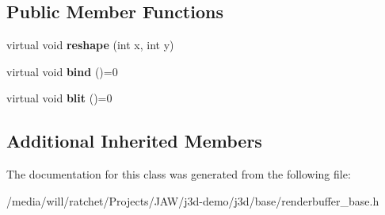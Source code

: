 \subsection*{Public Member Functions}
\begin{DoxyCompactItemize}
\item 
\hypertarget{classj3d_1_1base_1_1RenderbufferBase_a4d46858cdbeb14059b966103f49b1e6d}{}virtual void {\bfseries reshape} (int x, int y)\label{classj3d_1_1base_1_1RenderbufferBase_a4d46858cdbeb14059b966103f49b1e6d}

\item 
\hypertarget{classj3d_1_1base_1_1RenderbufferBase_acdfb90724dbd6d440037c739cb591544}{}virtual void {\bfseries bind} ()=0\label{classj3d_1_1base_1_1RenderbufferBase_acdfb90724dbd6d440037c739cb591544}

\item 
\hypertarget{classj3d_1_1base_1_1RenderbufferBase_aef0d7158533b26949cac74017bbbead7}{}virtual void {\bfseries blit} ()=0\label{classj3d_1_1base_1_1RenderbufferBase_aef0d7158533b26949cac74017bbbead7}

\end{DoxyCompactItemize}
\subsection*{Additional Inherited Members}


The documentation for this class was generated from the following file\+:\begin{DoxyCompactItemize}
\item 
/media/will/ratchet/\+Projects/\+J\+A\+W/j3d-\/demo/j3d/base/renderbuffer\+\_\+base.\+h\end{DoxyCompactItemize}

